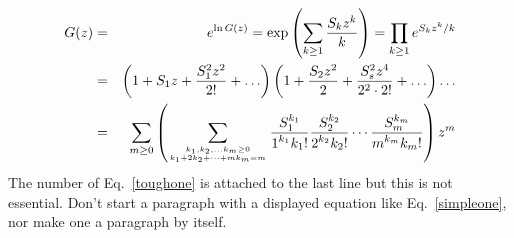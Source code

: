 \documentclass{cernatsreport}    %
\begin{document}
%
%
%
\newcommand{\kpositive}{k_1, k_2, \ldots k_m \ge 0 }
\newcommand{\mksum}{k_1 + 2k_2 + \cdots + mk_m = m}
%
%
\newcommand{\term}[1]{\frac{\displaystyle S_#1^{k_#1}}%
                           {\displaystyle #1^{k_#1} k_#1!}%
                     }
%
%
%
\begin{eqnarray}              %
G(z) &=& e^{\ln G(z) }
       = \exp\left(   \sum_{k \ge 1} { S_k z^k \over k}   \right)
       =  \displaystyle \prod_{k \ge 1}  e^{S_k z^k /k}
                          \nonumber \\   %
    &=& \left(                                         %
             1 + S_1 z +
                {S_1^2 z^2 \over 2! }
                  + \ldots                    %
        \right)                                       %
       \left( 1 + {S_2   z^2 \over 2}
                + {S_s^2 z^4 \over 2^2 \cdot 2!}
                + \ldots
                  \right) \ldots
                       \nonumber  \\    %
   &=&\displaystyle \sum_{m \ge 0}
      \left( \sum_{\kpositive \atop \mksum}   %
        \term{1} \term{2}  \cdots                  %
                 \term{m} \right)
                               z^m
\label{toughone}                %
\end{eqnarray}                  %
%
%
The number of Eq.~\ref{toughone} is attached to the last line
but this is not essential.
Don't start a paragraph with a displayed equation like
Eq.~\ref{simpleone}, %
nor make one a paragraph by itself.
\end{document}
